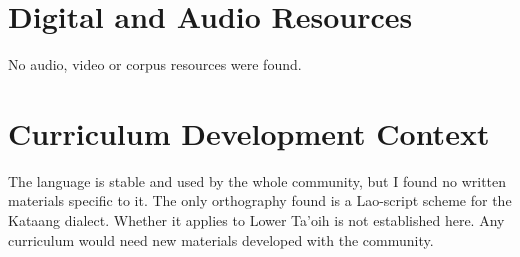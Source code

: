 \documentclass[12pt]{article}
\begin{document}
\section{Digital and Audio Resources}
No audio, video or corpus resources were found.

\section{Curriculum Development Context}
The language is stable and used by the whole community, but I found no written materials specific to it. The only orthography found is a Lao-script scheme for the Kataang dialect. Whether it applies to Lower Ta'oih is not established here. Any curriculum would need new materials developed with the community.
\end{document}
